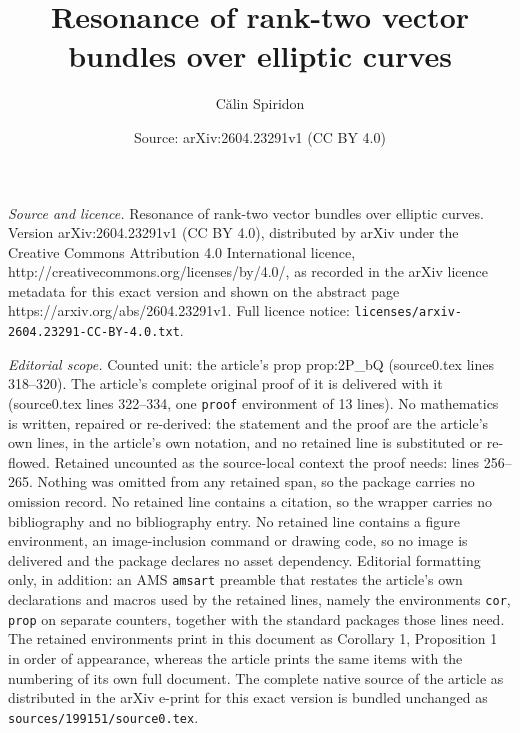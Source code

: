 \documentclass[10pt,a4paper]{amsart}
\title{Resonance of rank-two vector bundles over elliptic curves}
\author{C\u{a}lin Spiridon}
\date{Source: arXiv:2604.23291v1 (CC BY 4.0)}
\begin{document}
\maketitle

\noindent\emph{Source and licence.} Resonance of rank-two vector bundles over elliptic curves. Version arXiv:2604.23291v1 (CC BY 4.0), distributed by arXiv under the Creative Commons Attribution 4.0 International licence, http://creativecommons.org/licenses/by/4.0/, as recorded in the arXiv licence metadata for this exact version and shown on the abstract page https://arxiv.org/abs/2604.23291v1. Full licence notice: \texttt{licenses/arxiv-2604.23291-CC-BY-4.0.txt}.\par\smallskip

\noindent\textit{Editorial scope.} Counted unit: the article's prop prop:2P\_bQ (source0.tex lines 318--320). The article's complete original proof of it is delivered with it (source0.tex lines 322--334, one \texttt{proof} environment of 13 lines). No mathematics is written, repaired or re-derived: the statement and the proof are the article's own lines, in the article's own notation, and no retained line is substituted or re-flowed.  Retained uncounted as the source-local context the proof needs: lines 256--265.  Nothing was omitted from any retained span, so the package carries no omission record.  No retained line contains a citation, so the wrapper carries no bibliography and no bibliography entry.  No retained line contains a figure environment, an image-inclusion command or drawing code, so no image is delivered and the package declares no asset dependency.  Editorial formatting only, in addition: an AMS \texttt{amsart} preamble that restates the article's own declarations and macros used by the retained lines, namely the environments \texttt{cor}, \texttt{prop} on separate counters, together with the standard packages those lines need.  The retained environments print in this document as Corollary 1, Proposition 1 in order of appearance, whereas the article prints the same items with the numbering of its own full document.  The complete native source of the article as distributed in the arXiv e-print for this exact version is bundled unchanged as \texttt{sources/199151/source0.tex}.
\end{document}
